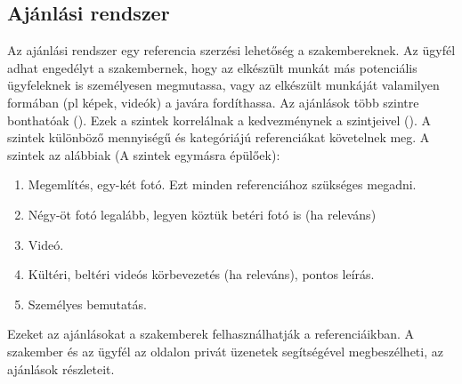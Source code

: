 \subsection{Ajánlási rendszer}
Az ajánlási rendszer egy referencia szerzési lehetőség a szakembereknek. Az ügyfél adhat engedélyt a szakembernek, hogy az elkészült munkát más potenciális ügyfeleknek is személyesen megmutassa, vagy az elkészült munkáját valamilyen formában (pl képek, videók) a javára fordíthassa. Az ajánlások több szintre bonthatóak (). Ezek a szintek korrelálnak a kedvezménynek a szintjeivel (). A szintek különböző mennyiségű és kategóriájú referenciákat követelnek meg. A szintek az alábbiak (A szintek egymásra épülőek):
\begin{enumerate}
  \item Megemlítés, egy-két fotó. Ezt minden referenciához szükséges megadni.
  \item Négy-öt fotó legalább, legyen köztük betéri fotó is (ha releváns)
  \item Videó.
  \item Kültéri, beltéri videós körbevezetés (ha releváns), pontos leírás.
  \item Személyes bemutatás.
\end{enumerate}
Ezeket az ajánlásokat a szakemberek felhasználhatják a referenciáikban. A szakember és az ügyfél az oldalon privát üzenetek segítségével megbeszélheti, az ajánlások részleteit.
